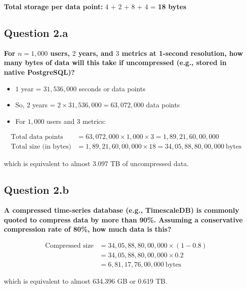 \documentclass[a4paper, 12pt]{article}
\begin{document}
\textbf{Total storage per data point:} 4 + 2 + 8 + 4 = \textbf{18 bytes}

\subsection*{Question 2.a}
\textbf{For $n = 1,000$ users, $2$ years, and $3$ metrics at 1-second resolution, how many bytes of data will this take if uncompressed (e.g., stored in native PostgreSQL)?}

\vspace{0.5em}

\begin{itemize}
    \item $1$ year = $31,536,000$ seconds or data points
    \item So, $2$ years = $2 \times 31,536,000 = 63,072,000$ data points
    \item For $1,000$ users and $3$ metrics:
\end{itemize}

\begin{align*}
\text{Total data points} &= 63,072,000 \times 1,000 \times 3 = 1,89,21,60,00,000 \\
\text{Total size (in bytes)} &= 1,89,21,60,00,000 \times 18 = 34,05,88,80,00,000\ \text{bytes}
\end{align*}

which is equivalent to almost 3.097 TB of uncompressed data.

\subsection*{Question 2.b}
\textbf{A compressed time-series database (e.g., TimescaleDB) is commonly quoted to compress data by more than 90\%. Assuming a conservative compression rate of 80\%, how much data is this?}

\vspace{0.5em}

\begin{align*}
\text{Compressed size} &= 34,05,88,80,00,000 \times (1 - 0.8) \\
&= 34,05,88,80,00,000 \times 0.2 \\
&= 6,81,17,76,00,000\ \text{bytes}
\end{align*}

\vspace{1em}

which is equivalent to almost 634.396 GB or 0.619 TB.
\end{document}
